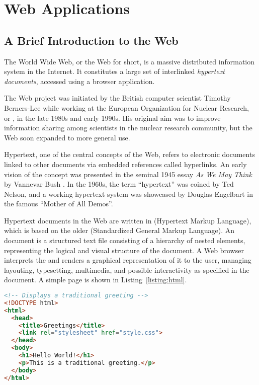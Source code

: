 \chapter{Web Applications}

\section{A Brief Introduction to the Web}

The World Wide Web, or the Web for short, is a massive distributed information system in the Internet. It constitutes a large set of interlinked \emph{hypertext documents}, accessed using a browser application.

The Web project was initiated by the British computer scientist Timothy Berners-Lee while working at the European Organization for Nuclear Research, or , in the late \num{1980s} and early \num{1990s}. His original aim was to improve information sharing among scientists in the nuclear research community, but the Web soon expanded to more general use. \cite{TblProposal} \cite{TblWWW}

Hypertext, one of the central concepts of the Web, refers to electronic documents linked to other documents via embedded references called hyperlinks. An early vision of the concept was presented in the seminal \num{1945} essay \emph{As We May Think} by Vannevar Bush \cite{Bush45}. In the \num{1960s}, the term ``hypertext'' was coined by Ted Nelson, and a working hypertext system was showcased by Douglas Engelbart in the famous ``Mother of All Demos''.

Hypertext documents in the Web are written in  (Hypertext Markup Language), which is based on the older  (Standardized General Markup Language). An  document is a structured text file consisting of a hierarchy of nested elements, representing the logical and visual structure of the document. A Web browser interprets the  and renders a graphical representation of it to the user, managing layouting, typesetting, multimedia, and possible interactivity as specified in the document. A simple  page is shown in Listing~\ref{listing:html}. \cite{HTML20}

\begin{code}
\begin{lstlisting}[language=HTML,caption=A small \ab{html} document.\label{listing:html}]
<!-- Displays a traditional greeting -->
<!DOCTYPE html>
<html>
  <head>
    <title>Greetings</title>
    <link rel="stylesheet" href="style.css">
  </head>
  <body>
    <h1>Hello World!</h1>
    <p>This is a traditional greeting.</p>
  </body>
</html>
\end{lstlisting}
\end{code}

